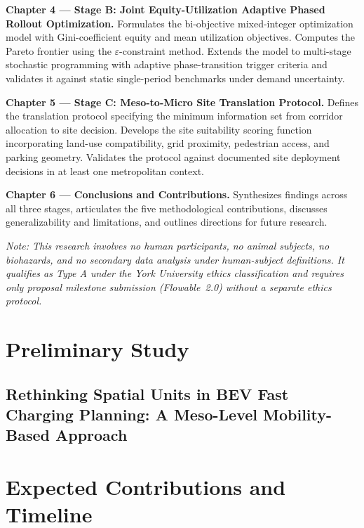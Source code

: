 \documentclass[12pt,letterpaper]{article}
\begin{document}
\textbf{Chapter 4 --- Stage B: Joint Equity-Utilization Adaptive
Phased Rollout Optimization.}
Formulates the bi-objective mixed-integer optimization model with
Gini-coefficient equity and mean utilization objectives.  Computes
the Pareto frontier using the $\varepsilon$-constraint method.
Extends the model to multi-stage stochastic programming with
adaptive phase-transition trigger criteria and validates it against
static single-period benchmarks under demand uncertainty.

\textbf{Chapter 5 --- Stage C: Meso-to-Micro Site Translation Protocol.}
Defines the translation protocol specifying the minimum information
set from corridor allocation to site decision.  Develops the site
suitability scoring function incorporating land-use compatibility,
grid proximity, pedestrian access, and parking geometry.  Validates
the protocol against documented site deployment decisions in at
least one metropolitan context.

\textbf{Chapter 6 --- Conclusions and Contributions.}
Synthesizes findings across all three stages, articulates the five
methodological contributions, discusses generalizability and
limitations, and outlines directions for future research.

\bigskip
\noindent\textit{Note: This research involves no human participants,
no animal subjects, no biohazards, and no secondary data analysis
under human-subject definitions.  It qualifies as Type A under the
York University ethics classification and requires only proposal
milestone submission (Flowable~2.0) without a separate ethics
protocol.}

\section{Preliminary Study}

\subsection{Rethinking Spatial Units in BEV Fast Charging Planning:
  A Meso-Level Mobility-Based Approach}
\label{sec:prior_work}



\section{Expected Contributions and Timeline}
\end{document}
